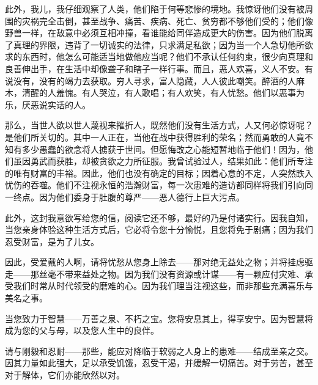 此外，我儿，我仔细观察了人类，他们陷于何等悲惨的境地。我惊讶他们没有被周围的灾祸完全击倒，甚至战争、痛苦、疾病、死亡、贫穷都不够他们受的；他们像野兽一样，在敌意中必须互相冲撞，看谁能给同伴造成更大的伤害。因为他们脱离了真理的界限，违背了一切诚实的法律，只求满足私欲；因为当一个人急切他所欲求的东西时，他怎么可能适当地做他应当呢？他们不承认任何约束，很少向真理和良善伸出手，在生活中却像聋子和瞎子一样行事。而且，恶人欢喜，义人不安。有说没有，没有的竭力去获取。穷人寻求，富人隐藏，人人彼此嘲笑。醉酒的人麻木，清醒的人羞愧。有人哭泣，有人歌唱；有人欢笑，有人忧愁。他们以恶事为乐，厌恶说实话的人。\newline{}\par

那么，当世人欲以世人蔑视来摧折人，既然他们没有生活方式，人又何必惊讶呢？是他们所关切的。其中一人正在，当他在战中获得胜利的荣名；然而勇敢的人竟不知有多少愚蠢的欲念将人掳获于世间。但愿悔改之心能短暂地临于他们！因为，他们虽因勇武而获胜，却被贪欲之力所征服。我曾试验过人，结果如此：他们所专注的唯有财富的丰裕。因此，他们也没有确定的目标；因着心意的不定，人突然跌入忧伤的吞噬。他们不注视永恒的浩瀚财富，每一次患难的造访都同样将我们引向同一终点。因为他们委身于肚腹的尊严——恶人德行上巨大污点。\par

此外，这封我意欲写给您的信，阅读它还不够，最好的乃是付诸实行。因我自知，当您亲身体验这种生活方式后，它必将令您十分愉悦，且您将免于剧痛；因为我们忍受财富，是为了儿女。\par

因此，受爱戴的人啊，请将忧愁从您身上除去——那对绝无益处之物；并将挂虑驱走——那丝毫不带来益处之物。因为我们没有资源或计谋——有一颗应付灾难、承受我们时常从时代领受的磨难的心。因为我们理当注视这些，而非那些充满喜乐与美名之事。\par

当您致力于智慧——万善之泉、不朽之宝。您将安息其上，得享安宁。因为智慧将成为您的父与母，以及您人生中的良伴。\par

请与刚毅和忍耐——那些，能应对降临于软弱之人身上的患难——结成至亲之交。因其力量如此强大，足以承受饥饿，忍受干渴，并缓解一切痛苦。对于劳苦，甚至对于解体，它们亦能欣然以对。\par

